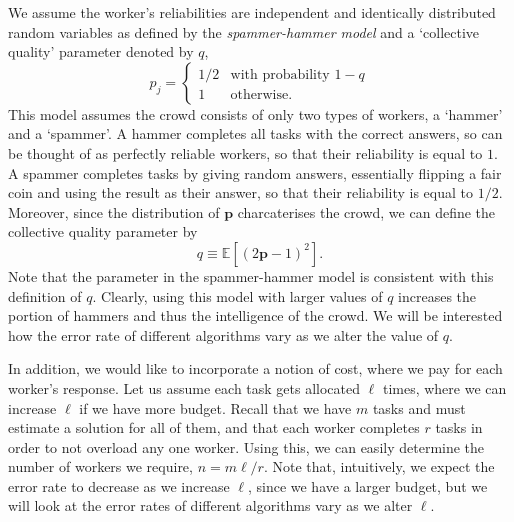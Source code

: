 \documentclass[12pt]{article}
\numberwithin{equation}{section}
\begin{document}
We assume the worker's reliabilities are independent and identically distributed random variables as defined by the \textit{spammer-hammer model} and a `collective quality' parameter denoted by $q$,
\begin{equation*}
	p_{j} =
	\begin{cases}
		1/2 & \text{with probability } 1-q\\
		1 & \text{otherwise}.
	\end{cases}
\end{equation*}
This model assumes the crowd consists of only two types of workers, a `hammer' and a `spammer'. A hammer completes all tasks with the correct answers, so can be thought of as perfectly reliable workers, so that their reliability is equal to $1$. A spammer completes tasks by giving random answers, essentially flipping a fair coin and using the result as their answer, so that their reliability is equal to $1/2$.  Moreover, since the distribution of $\mathbf{p}$ charcaterises the crowd, we can define the collective quality parameter by
\begin{equation*}
	q \equiv \mathbb{E}[(2\mathbf{p}-1)^{2}].
\end{equation*}
Note that the parameter in the spammer-hammer model is consistent with this definition of $q$.
Clearly, using this model with larger values of $q$ increases the portion of hammers and thus the intelligence of the crowd. We will be interested how the error rate of different algorithms vary as we alter the value of $q$.

In addition, we would like to incorporate a notion of cost, where we pay for each worker's response. Let us assume each task gets allocated $\ell$ times, where we can increase $\ell$ if we have more budget. Recall that we have $m$ tasks and must estimate a solution for all of them, and that each worker completes $r$ tasks in order to not overload any one worker. Using this, we can easily determine the number of workers we require, $n = m\ell/r$. Note that, intuitively, we expect the error rate to decrease as we increase $\ell$, since we have a larger budget, but we will look at the error rates of different algorithms vary as we alter $\ell$.
\end{document}
